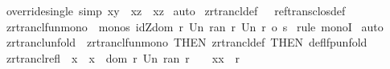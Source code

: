 \begin{isabellebody}
%
\endisatagproof
{\isafoldproof}%
%
\isadelimproof
\isanewline
%
\endisadelimproof
\isanewline
{}\isamarkupfalse%
\ override{\isacharunderscore}single\ {\isacharbrackleft}simp{\isacharbrackright}{\isacharcolon}\ {\isachardoublequoteopen}{\isacharbraceleft}{\isacharparenleft}x{\isacharcomma}y{\isacharparenright}{\isacharbraceright}\ {\isacharparenleft}{\isacharplus}{\isacharparenright}\ {\isacharbraceleft}{\isacharparenleft}x{\isacharcomma}z{\isacharparenright}{\isacharbraceright}\ {\isacharequal}\ {\isacharbraceleft}{\isacharparenleft}x{\isacharcomma}z{\isacharparenright}{\isacharbraceright}{\isachardoublequoteclose}\isanewline
%
\isadelimproof
%
\endisadelimproof
%
\isatagproof
{}\isamarkupfalse%
\ auto\isanewline
{}\isamarkupfalse%
%
\endisatagproof
{\isafoldproof}%
%
\isadelimproof
%
\endisadelimproof
%
\isamarkuptrue%
\isamarkupfalse%
\ zrtrancl{\isacharunderscore}def\ {\isacharequal}\ \ ref{\isacharunderscore}trans{\isacharunderscore}clos{\isacharunderscore}def\isanewline
\isanewline
{}\isamarkupfalse%
\ zrtrancl{\isacharunderscore}fun{\isacharunderscore}mono\ {\isacharcolon}\ {\isachardoublequoteopen}mono{\isacharparenleft}{\isacharpercent}s{\isachardot}\ idZ{\isacharparenleft}dom\ r\ Un\ ran\ r{\isacharparenright}\ Un\ {\isacharparenleft}r\ {\isacharpercent}o\ s{\isacharparenright}{\isacharparenright}{\isachardoublequoteclose}\isanewline
%
\isadelimproof
%
\endisadelimproof
%
\isatagproof
{}\isamarkupfalse%
\ {\isacharparenleft}rule\ monoI{\isacharparenright}\isanewline
{}\isamarkupfalse%
\ auto\isanewline
{}\isamarkupfalse%
%
\endisatagproof
{\isafoldproof}%
%
\isadelimproof
\isanewline
%
\endisadelimproof
\isanewline
{}\isamarkupfalse%
\ zrtrancl{\isacharunderscore}unfold\ {\isacharequal}\ zrtrancl{\isacharunderscore}fun{\isacharunderscore}mono\ {\isacharbrackleft}THEN\ zrtrancl{\isacharunderscore}def\ {\isacharbrackleft}THEN\ def{\isacharunderscore}lfp{\isacharunderscore}unfold{\isacharbrackright}{\isacharbrackright}\ \isanewline
\isanewline
{}\isamarkupfalse%
\ zrtrancl{\isacharunderscore}refl{}\ {\isacharcolon}\ {\isachardoublequoteopen}{\isacharbang}{\isacharbang}x{\isachardot}\ {\isacharbrackleft}{\isacharbar}\ x\ {\isacharcolon}\ dom\ r\ Un\ ran\ r\ {\isacharbar}{\isacharbrackright}\ \ {\isacharequal}{\isacharequal}{\isachargreater}\ {\isacharparenleft}x{\isacharcomma}x{\isacharparenright}\ {\isacharcolon}\ {\isacharparenleft}r\ {\isacharpercent}{\isacharasterisk}{\isacharparenright}{\isachardoublequoteclose}\isanewline

\end{isabellebody}
